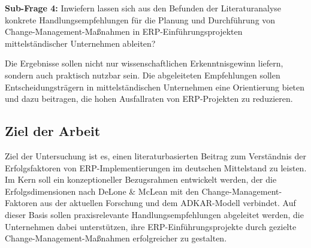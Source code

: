 \textbf{Sub-Frage 4:} Inwiefern lassen sich aus den Befunden der Literaturanalyse konkrete Handlungsempfehlungen für die Planung und Durchführung von Change-Management-Ma\ss{}nahmen in ERP-Einführungsprojekten mittelständischer Unternehmen ableiten?

Die Ergebnisse sollen nicht nur wissenschaftlichen Erkenntnisgewinn liefern, sondern auch praktisch nutzbar sein. Die abgeleiteten Empfehlungen sollen Entscheidungsträgern in mittelständischen Unternehmen eine Orientierung bieten und dazu beitragen, die hohen Ausfallraten von ERP-Projekten zu reduzieren.

\subsection{Ziel der Arbeit}

Ziel der Untersuchung ist es, einen literaturbasierten Beitrag zum Verständnis der Erfolgsfaktoren von ERP-Implementierungen im deutschen Mittelstand zu leisten. Im Kern soll ein konzeptioneller Bezugsrahmen entwickelt werden, der die Erfolgsdimensionen nach DeLone \& McLean mit den Change-Management-Faktoren aus der aktuellen Forschung und dem ADKAR-Modell verbindet. Auf dieser Basis sollen praxisrelevante Handlungsempfehlungen abgeleitet werden, die Unternehmen dabei unterstützen, ihre ERP-Einführungsprojekte durch gezielte Change-Management-Ma\ss{}nahmen erfolgreicher zu gestalten.
